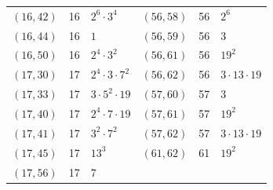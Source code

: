 \documentclass[11pt]{article}
\begin{document}
\begin{longtable}{@{}lrl@{\qquad}lrl@{}}
$(16,42)$ & 16 & $2^{6}\cdot 3^{4}$ & $(56,58)$ & 56 & $2^{6}$\\
$(16,44)$ & 16 & $1$ & $(56,59)$ & 56 & $3$\\
$(16,50)$ & 16 & $2^{4}\cdot 3^{2}$ & $(56,61)$ & 56 & $19^{2}$\\
$(17,30)$ & 17 & $2^{4}\cdot 3\cdot 7^{2}$ & $(56,62)$ & 56 & $3\cdot 13\cdot 19$\\
$(17,33)$ & 17 & $3\cdot 5^{2}\cdot 19$ & $(57,60)$ & 57 & $3$\\
$(17,40)$ & 17 & $2^{4}\cdot 7\cdot 19$ & $(57,61)$ & 57 & $19^{2}$\\
$(17,41)$ & 17 & $3^{2}\cdot 7^{2}$ & $(57,62)$ & 57 & $3\cdot 13\cdot 19$\\
$(17,45)$ & 17 & $13^{3}$ & $(61,62)$ & 61 & $19^{2}$\\
$(17,56)$ & 17 & $7$ & & &\\
\end{longtable}
\endgroup
\end{document}
